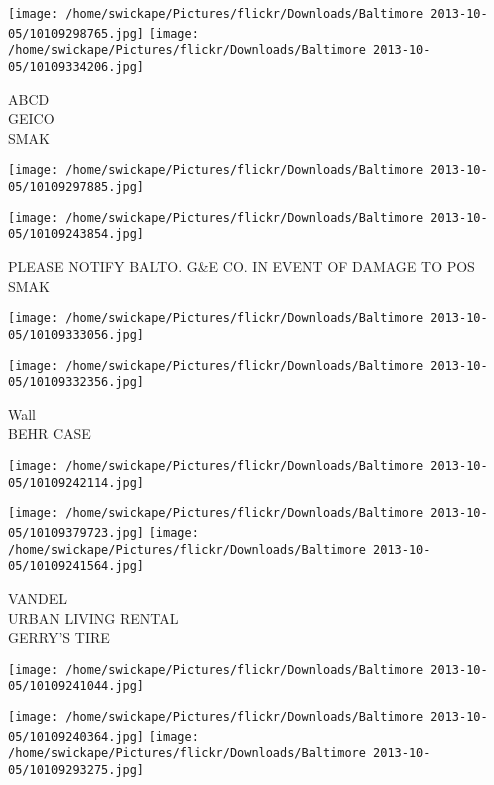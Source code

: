 \documentclass[10pt,letterpaper]{article}
\begin{document}
\vspace{0.25in}
\texttt{[image: /home/swickape/Pictures/flickr/Downloads/Baltimore 2013-10-05/10109298765.jpg]}
\texttt{[image: /home/swickape/Pictures/flickr/Downloads/Baltimore 2013-10-05/10109334206.jpg]}

ABCD\\
GEICO\\
SMAK\\
\pagebreak

\texttt{[image: /home/swickape/Pictures/flickr/Downloads/Baltimore 2013-10-05/10109297885.jpg]}

\vspace{0.25in}
\texttt{[image: /home/swickape/Pictures/flickr/Downloads/Baltimore 2013-10-05/10109243854.jpg]}

PLEASE NOTIFY BALTO. G\&E CO. IN EVENT OF DAMAGE TO POS\\
SMAK\\
\pagebreak

\texttt{[image: /home/swickape/Pictures/flickr/Downloads/Baltimore 2013-10-05/10109333056.jpg]}

\vspace{0.25in}
\texttt{[image: /home/swickape/Pictures/flickr/Downloads/Baltimore 2013-10-05/10109332356.jpg]}

Wall\\
BEHR CASE\\
\pagebreak

\texttt{[image: /home/swickape/Pictures/flickr/Downloads/Baltimore 2013-10-05/10109242114.jpg]}

\vspace{0.25in}
\texttt{[image: /home/swickape/Pictures/flickr/Downloads/Baltimore 2013-10-05/10109379723.jpg]}
\texttt{[image: /home/swickape/Pictures/flickr/Downloads/Baltimore 2013-10-05/10109241564.jpg]}

VANDEL\\
URBAN LIVING RENTAL\\
GERRY'S TIRE\\
\pagebreak

\texttt{[image: /home/swickape/Pictures/flickr/Downloads/Baltimore 2013-10-05/10109241044.jpg]}

\vspace{0.25in}
\texttt{[image: /home/swickape/Pictures/flickr/Downloads/Baltimore 2013-10-05/10109240364.jpg]}
\texttt{[image: /home/swickape/Pictures/flickr/Downloads/Baltimore 2013-10-05/10109293275.jpg]}
\end{document}
